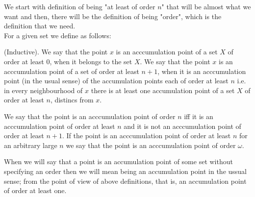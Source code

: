 We start with definition of being "at least of order $n$" that will be almost what we want
and then, there will be the definition of being "order", which is the definition that we need. \\
For a given set we define as follows:
\begin{definition}
(Inductive). 
We say that the point $x$ is an acccumulation point of a set $X$ 
of order at least $0$, when it belongs to the set $X$. 
We say that the point $x$ is an acccumulation point of a set 
of order at least $n + 1$, when it is 
an acccumulation point (in the usual sense) of the accumulation points each of order at least 
$n$ i.e. in every neighbourhood of $x$ there is at least one accumulation point of a set $X$ 
of order at least $n$, distincs from $x$. 
\end{definition}  
\begin{definition}
We say that the point is an acccumulation point of order $n$ iff it is an acccumulation point 
of order at least $n$ and it is not an acccumulation point of order at least $n+1$. 
If the point is an acccumulation point of order at least $n$ for an arbitrary large 
$n$ we say that 
the point is an acccumulation point of order $\omega$.
\end{definition}
When we will say that a point is an accumulation point of some set without specifying an order 
then we will mean being an accumulation point in the ussual sense; from the point of view 
of above definitions, that is, an accumulation point of order at least one.


